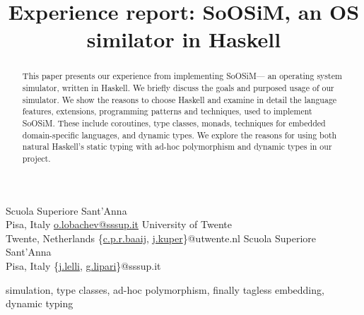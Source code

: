 \documentclass[preprint]{sigplanconf}
\newcommand{\soosim}{SoOSiM\xspace}
\begin{document}
\copyrightdata{[to be supplied]}

\preprintfooter{\today}   %

\title{Experience report: \soosim, an OS similator in Haskell}

           {Scuola Superiore Sant'Anna\\Pisa, Italy}
           {\href{mailto:o.lobachev@sssup.it}{o.lobachev@sssup.it}}
           {University of Twente\\Twente, Netherlands}
           {\{\href{mailto:c.p.r.baaij@utwente.nl}{c.p.r.baaij}, \href{mailto:j.kuper@utwente.nl}{j.kuper}\}@utwente.nl}
           {Scuola Superiore Sant'Anna\\Pisa, Italy}
           {\{\href{mailto:j.lelli@sssup.it}{j.lelli}, \href{mailto:g.lipari@sssup.it}{g.lipari}\}@sssup.it}


\maketitle

\begin{abstract}
This paper presents our experience from implementing \soosim --- an operating system simulator, written in Haskell. 
We briefly discuss the goals and purposed usage of our simulator. 
We show the reasons to choose Haskell and examine in detail the language features, extensions, programming patterns and techniques, used to implement \soosim. 
These include coroutines, type classes, monads, techniques for embedded domain-specific languages, and dynamic types. 
We explore the reasons for using both natural Haskell's static typing with ad-hoc polymorphism and dynamic types in our project.
\end{abstract}



\keywords
simulation, type classes, ad-hoc polymorphism, finally tagless embedding, dynamic typing






%


%
%
\end{document}
